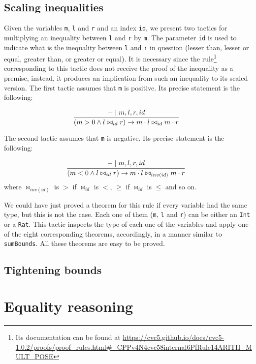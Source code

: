 \subsection{Scaling inequalities}

Given the variables \texttt{m}, \texttt{l} and \texttt{r} and an index \texttt{id},
we present two tactics for multiplying an inequality between \texttt{l} and \texttt{r}
by \texttt{m}. The parameter \texttt{id} is used to indicate what is the inequality
between \texttt{l} and \texttt{r} in question (lesser than, lesser or equal, greater than, or greater or equal). It is necessary since the rule\footnote{Its documentation can be found at \url{https://cvc5.github.io/docs/cvc5-1.0.2/proofs/proof\_rules.html\#\_CPPv4N4cvc58internal6PfRule14ARITH\_MULT\_POSE}} corresponding to this tactic does not receive the proof of the inequality
as a premise, instead, it produces an implication from such an inequality to its
scaled version. The first tactic assumes that \texttt{m} is positive. Its precise
statement is the following:

\[
\infer[]{(m > 0 \wedge l \bowtie_{id} r) \rightarrow m \cdot l \bowtie_{id} m \cdot r}{- \mid m, l, r, id}
\]

The second tactic assumes that \texttt{m} is negative. Its precise statement is the following:

\[
\infer[]{(m < 0 \wedge l \bowtie_{id} r) \rightarrow m \cdot l \bowtie_{inv(id)} m \cdot r}{- \mid m, l, r, id}
\]
where $\bowtie_{inv(id)}$ is $>$ if $\bowtie_{id}$ is $<$, $\ge$ if $\bowtie_{id}$ is $\le$ and so on.

We could have just proved a theorem for this rule if every variable had the
same type, but this is not the case. Each one of them (\texttt{m}, \texttt{l} and \texttt{r}) can be either an \texttt{Int} or a \texttt{Rat}. This tactic inspects
the type of each one of the variables and apply one of the eight corresponding theorems,
accordingly, in a manner similar to \texttt{sumBounds}. All these theorems are
easy to be proved.


\subsection{Tightening bounds}


\section{Equality reasoning}


